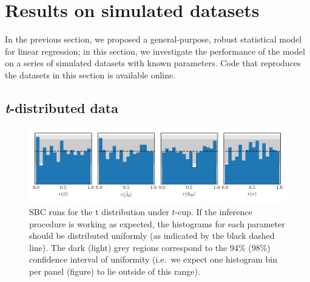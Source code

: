 \documentclass[fleqn,usenatbib]{rasti}
\begin{document}





\section{Results on simulated datasets}
\label{sec:results}

In the previous section, we proposed a general-purpose, robust statistical model
for linear regression; in this section, we investigate the performance of the
model on a series of simulated datasets with known parameters. Code that
reproduces the datasets in this section is available online\footnotemark.


\subsection{\textit{t}-distributed data}
\label{sec:results.t}

\begin{figure}
    \includegraphics[width=\textwidth]{graphics/sbc/tcup/t/sbc.pdf}
    \caption{SBC runs for the t distribution under $t$-cup. If the inference
    procedure is working as expected, the histograms for each parameter should
    be distributed uniformly (as indicated by the black dashed line). The dark
    (light) grey regions correspond to the 94\% (98\%) confidence interval of
    uniformity (i.e.\ we expect one histogram bin per panel (figure) to lie
    outside of this range).}
    \label{fig:results.t.sbc}
\end{figure}
\end{document}
